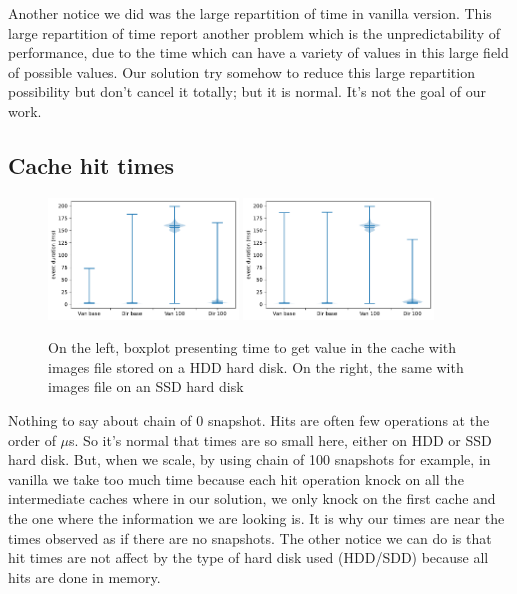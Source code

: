 \documentclass[sigplan,screen,10pt]{acmart}
\begin{document}
	Another notice we did was the large repartition of time in vanilla version. This large repartition of time report another problem which is the unpredictability of performance, due to the time which can have a variety of values in this large field of possible values. Our solution try somehow to reduce this large repartition possibility but don't cancel it totally; but it is normal. It's not the goal of our work.
	
	\subsection*{Cache hit times}
	
	\begin{figure}[h]
		\center
		\includegraphics[width=0.45\textwidth]{HIT_time_hdd.pdf}
		\includegraphics[width=0.45\textwidth]{HIT_time_ssd.pdf}
		\caption{On the left, boxplot presenting time to get value in the cache with images file stored on a HDD hard disk. On the right, the same with images file on an SSD hard disk}
		\label{fig:fig_b}
	\end{figure}

	Nothing to say about chain of 0 snapshot. Hits are often few operations at the order of $\mu$s. So it's normal that times are so small here, either on HDD or SSD hard disk.
	But, when we scale, by using chain of 100 snapshots for example, in vanilla we take too much time because each hit operation knock on all the intermediate caches where in our solution, we only knock on the first cache and the one where the information we are looking is. It is why our times are near the times observed as if there are no snapshots.
	The other notice we can do is that hit times are not affect by the type of hard disk used (HDD/SDD) because all hits are done in memory.
	
\end{document}
